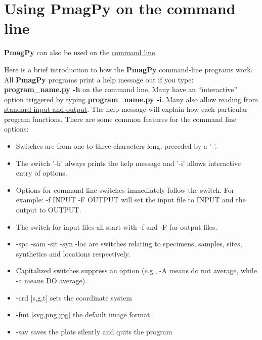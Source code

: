 \documentclass[11pt]{book}
\begin{document}
{{\section{Using PmagPy on the command line}

{\bf PmagPy}  can also be used on the \href{#command_line}{command line}.

Here is a brief introduction to how the {\bf PmagPy} command-line programs work.  All {\bf PmagPy} programs print a help message out if you type: {\bf program\_name.py -h} on the command line.  Many have an ``interactive'' option triggered by typing {\bf program\_name.py -i}.  Many also allow reading from \href{#standard_IO }{standard input and output}.   The help message will explain how each particular program functions.  There are some common features for the command line options:


\begin{itemize}
\item Switches are from one to three characters long, preceded by a '-'.
\item The switch '-h' always prints the help message and '-i' allows interactive entry of options.
\item  Options for command line switches immediately follow the switch.  For example:  -f INPUT -F OUTPUT will set the input file to INPUT and the output to OUTPUT.
\item  The switch for input  files all start with -f and -F for output files.
\item -spc -sam -sit -syn  -loc are switches relating to specimens, samples, sites, synthetics and locations respectively.
\item Capitalized switches suppress an option (e.g., -A means do not average, while -a means DO average).
\item -crd [s,g,t] sets the coordinate system
\item -fmt [svg,png,jpg] the default image format.
\item -sav  saves the plots silently and quits the program
\end{itemize}
\newcommand{\stt}{\small\tt}
\newcount\exnum
\outer{}


}}
\end{document}
